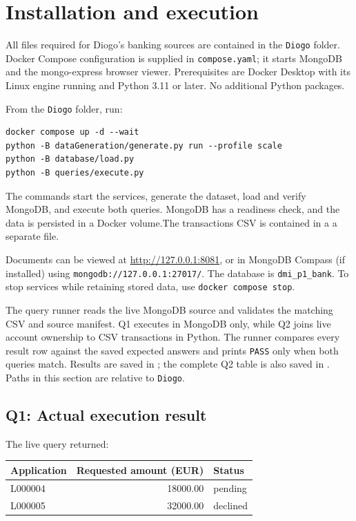 \documentclass[11pt,a4paper]{article}
\begin{document}
\section{Installation and execution}

All files required for Diogo's banking sources are contained in the
\texttt{Diogo} folder. Docker Compose configuration is supplied in
\texttt{compose.yaml}; it starts MongoDB and the mongo-express browser viewer.
Prerequisites are Docker Desktop with its Linux engine running and Python
3.11 or later. No additional Python packages.

From the \texttt{Diogo} folder, run:
\begin{lstlisting}
docker compose up -d --wait
python -B dataGeneration/generate.py run --profile scale
python -B database/load.py
python -B queries/execute.py
\end{lstlisting}

The commands start the services, generate the dataset,
load and verify MongoDB, and execute both queries. MongoDB has a readiness
check, and the data is persisted in a Docker volume.The transactions CSV
is contained in a a separate file.

Documents can be viewed at \url{http://127.0.0.1:8081}, or in MongoDB Compass (if installed)
using \texttt{mongodb://127.0.0.1:27017/}. The database is
\texttt{dmi\_p1\_bank}. To stop services while retaining stored data, use
\texttt{docker compose stop}.

The query runner reads the live MongoDB source and validates the matching
CSV and source manifest. Q1 executes in MongoDB only, while Q2 joins live
account ownership to CSV transactions in Python.
The runner compares every result row against the saved expected answers and
prints \texttt{PASS} only when both queries match. Results are saved in
; the complete Q2 table is also
saved in . Paths in this section are
relative to \texttt{Diogo}.

\subsection{Q1: Actual execution result}

The live query returned:

\begingroup
\renewcommand{\arraystretch}{1.2}
\begin{tabularx}{\textwidth}{@{}l r >{\raggedright\arraybackslash}X@{}}
\toprule
Application & Requested amount (EUR) & Status\\
\midrule
L000004 & 18000.00 & pending\\
L000005 & 32000.00 & declined\\
\bottomrule
\end{tabularx}
\endgroup
\end{document}
